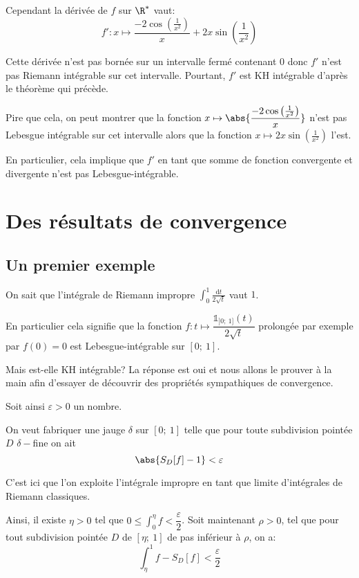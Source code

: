 Cependant la dérivée de $f$ sur $\R^*$ vaut:
\[
f': x \mapsto \dfrac{-2\cos \left ( \frac{1}{x^2}\right )}{x}+2x\sin\left ( \frac{1}{x^2}\right )
\]

Cette dérivée n'est pas bornée sur un intervalle fermé contenant $0$ donc $f'$ n'est pas Riemann intégrable sur cet intervalle. Pourtant, $f'$ est KH intégrable d'après le théorème qui précède.

Pire que cela, on peut montrer que la fonction $x \mapsto \abs{\dfrac{-2\cos \left ( \frac{1}{x^2}\right )}{x}}$ n'est pas Lebesgue intégrable sur cet intervalle alors que la fonction $x \mapsto 2x\sin\left ( \frac{1}{x^2}\right )$ l'est. 

En particulier, cela implique que $f'$ en tant que somme de fonction convergente et divergente n'est pas Lebesgue-intégrable.

\section{Des résultats de convergence}

\subsection{Un premier exemple}

On sait que l'intégrale de Riemann impropre $\int_0^1 \frac{\mathrm d t}{2\sqrt{t}}$ vaut $1$. 

En particulier cela signifie que la fonction $f: t \mapsto \dfrac{\mathbb{1}_{]0;~1]}(t)}{2\sqrt{t}}$ prolongée par exemple par $f(0)=0$ est Lebesgue-intégrable sur $[0;~1]$.

Mais est-elle KH intégrable? La réponse est oui et nous allons le prouver \og à la main \fg{} afin d'essayer de découvrir des propriétés sympathiques de convergence.


Soit ainsi $\varepsilon>0$ un nombre. 

On veut fabriquer  une jauge $\delta$ sur $[0;~1]$ telle que pour toute subdivision pointée $D$ $\delta-$fine on ait 
\[
\abs{S_D[f]-1} < \varepsilon
\]


C'est ici que l'on exploite l'intégrale impropre en tant que limite d'intégrales de Riemann \og classiques. \fg{}

Ainsi, il existe $\eta>0$ tel que $0 \leq \int_0^\eta f < \dfrac{\varepsilon}{2}$. Soit maintenant $\rho>0$, tel que pour tout subdivision pointée $D$ de $[\eta;~1]$ de pas inférieur à $\rho$, on a:
\[
\int_\eta^1 f - S_D[f] < \dfrac{\varepsilon}{2}
\]

